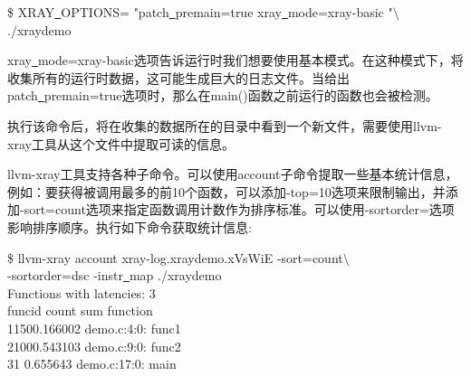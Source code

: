 \begin{tcolorbox}[colback=white,colframe=black]
\$ XRAY\underline{~}OPTIONS= "patch\underline{~}premain=true xray\underline{~}mode=xray-basic "$\setminus$ \\
./xraydemo
\end{tcolorbox}

xray\underline{~}mode=xray-basic选项告诉运行时我们想要使用基本模式。在这种模式下，将收集所有的运行时数据，这可能生成巨大的日志文件。当给出patch\underline{~}premain=true选项时，那么在main()函数之前运行的函数也会被检测。\par

执行该命令后，将在收集的数据所在的目录中看到一个新文件，需要使用llvm-xray工具从这个文件中提取可读的信息。\par

llvm-xray工具支持各种子命令。可以使用account子命令提取一些基本统计信息，例如：要获得被调用最多的前10个函数，可以添加-top=10选项来限制输出，并添加-sort=count选项来指定函数调用计数作为排序标准。可以使用-sortorder=选项影响排序顺序。执行如下命令获取统计信息:\par

\begin{tcolorbox}[colback=white,colframe=black]
\$ llvm-xray account xray-log.xraydemo.xVsWiE -sort=count$\setminus$ \\
\hspace*{0.5cm}-sortorder=dsc -instr\underline{~}map ./xraydemo \\
Functions with latencies: 3 \\
\hspace*{0.5cm}funcid \hspace{1cm}count \hspace{2cm}sum \hspace{1cm}function \\
\hspace*{1.4cm}1\hspace{1.4cm}150\hspace{1.4cm}0.166002 \hspace{1cm}demo.c:4:0: func1 \\
\hspace*{1.4cm}2\hspace{1.4cm}100\hspace{1.4cm}0.543103 \hspace{1cm}demo.c:9:0: func2 \\
\hspace*{1.4cm}3\hspace{1.8cm}1 \hspace{1.3cm}0.655643 \hspace{1cm}demo.c:17:0: main
\end{tcolorbox}


